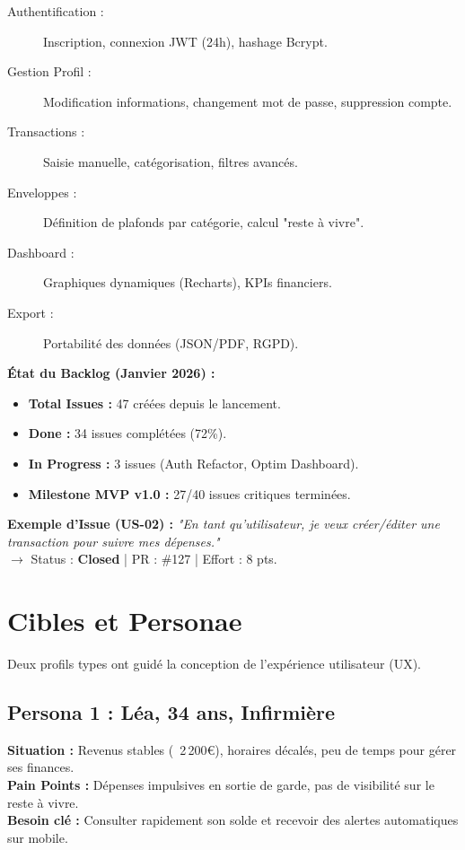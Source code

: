 \begin{description}
    \item[Authentification :] Inscription, connexion JWT (24h), hashage Bcrypt.
    \item[Gestion Profil :] Modification informations, changement mot de passe, suppression compte.
    \item[Transactions :] Saisie manuelle, catégorisation, filtres avancés.
    \item[Enveloppes :] Définition de plafonds par catégorie, calcul "reste à vivre".
    \item[Dashboard :] Graphiques dynamiques (Recharts), KPIs financiers.
    \item[Export :] Portabilité des données (JSON/PDF, RGPD).
\end{description}

\begin{tcolorbox}[colback=yellow!5!white,colframe=yellow!60!black,title=\textbf{Suivi de projet GitHub -- Données réelles}]
\textbf{État du Backlog (Janvier 2026) :}
\begin{itemize}
    \item \textbf{Total Issues :} 47 créées depuis le lancement.
    \item \textbf{Done :} 34 issues complétées (72\%).
    \item \textbf{In Progress :} 3 issues (Auth Refactor, Optim Dashboard).
    \item \textbf{Milestone MVP v1.0 :} 27/40 issues critiques terminées.
\end{itemize}

\textbf{Exemple d'Issue (US-02) :}
\textit{"En tant qu'utilisateur, je veux créer/éditer une transaction pour suivre mes dépenses."} \\
$\rightarrow$ Status : \textbf{Closed} | PR : \#127 | Effort : 8 pts.
\end{tcolorbox}

\section{Cibles et Personae}

Deux profils types ont guidé la conception de l'expérience utilisateur (UX).

\subsection{Persona 1 : Léa, 34 ans, Infirmière}
\textbf{Situation :} Revenus stables (~2\,200€), horaires décalés, peu de temps pour gérer ses finances. \\
\textbf{Pain Points :} Dépenses impulsives en sortie de garde, pas de visibilité sur le reste à vivre. \\
\textbf{Besoin clé :} Consulter rapidement son solde et recevoir des alertes automatiques sur mobile.

